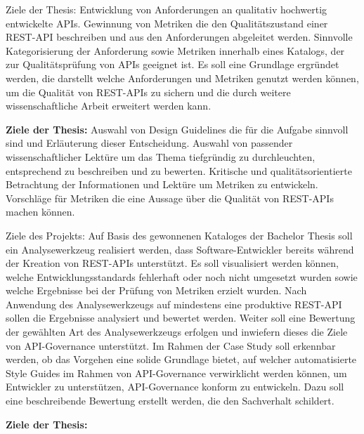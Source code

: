 \documentclass[../../expose]{subfiles}
\begin{document}
Ziele der Thesis:	
Entwicklung von Anforderungen an qualitativ hochwertig entwickelte APIs. Gewinnung von Metriken die den Qualitätszustand einer REST-API beschreiben und aus den Anforderungen abgeleitet werden. Sinnvolle Kategorisierung der Anforderung sowie Metriken innerhalb eines Katalogs, der zur Qualitätsprüfung von APIs geeignet ist. Es soll eine Grundlage ergründet werden, die darstellt welche Anforderungen und Metriken genutzt werden können, um die Qualität von REST-APIs zu sichern und die durch weitere wissenschaftliche Arbeit erweitert werden kann.	

\textbf{Ziele der Thesis:}
Auswahl von Design Guidelines die für die Aufgabe sinnvoll sind und Erläuterung dieser Entscheidung.
Auswahl von passender wissenschaftlicher Lektüre um das Thema tiefgründig zu durchleuchten, entsprechend zu beschreiben und zu bewerten.
Kritische und qualitätsorientierte Betrachtung der Informationen und Lektüre um Metriken zu entwickeln.
Vorschläge für Metriken die eine Aussage über die Qualität von REST-APIs machen können.


Ziele des Projekts:	
Auf Basis des gewonnenen Kataloges der Bachelor Thesis soll ein Analysewerkzeug realisiert werden, dass Software-Entwickler bereits während der Kreation von REST-APIs unterstützt. Es soll visualisiert werden können, welche Entwicklungsstandards fehlerhaft oder noch nicht umgesetzt wurden sowie welche Ergebnisse bei der Prüfung von Metriken erzielt wurden. 	
Nach Anwendung des Analysewerkzeugs auf mindestens eine produktive REST-API sollen die Ergebnisse analysiert und bewertet werden. 	
Weiter soll eine Bewertung der gewählten Art des Analysewerkzeugs erfolgen und inwiefern dieses die Ziele von API-Governance unterstützt.	
Im Rahmen der Case Study soll erkennbar werden, ob das Vorgehen eine solide Grundlage bietet, auf welcher automatisierte Style Guides im Rahmen von API-Governance verwirklicht werden können, um Entwickler zu unterstützen, API-Governance konform zu entwickeln. Dazu soll eine beschreibende Bewertung erstellt werden, die den Sachverhalt schildert.

\textbf{Ziele der Thesis:}
\end{document}
